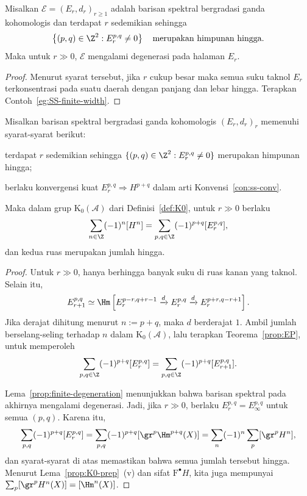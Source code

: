 \begin{lemma}\label{prop:finite-degeneration}
	Misalkan $\mathscr{E}=(E_r,d_r)_{r\geq1}$ adalah barisan spektral
	bergradasi ganda kohomologis dan terdapat $r$ sedemikian sehingga
	\[ \left\{(p,q)\in\Z^2:E_r^{p,q}\neq0\right\}
	\quad\text{merupakan himpunan hingga}. \]
	Maka untuk $r\gg0$, $\mathscr{E}$ mengalami degenerasi pada halaman $E_r$.
\end{lemma}
\begin{proof}
	Menurut syarat tersebut, jika $r$ cukup besar maka semua suku taknol $E_r$
	terkonsentrasi pada suatu daerah dengan panjang dan lebar hingga. Terapkan
	Contoh~\ref{eg:SS-finite-width}.
\end{proof}

\begin{proposition}\label{prop:EP-ss}
	Misalkan barisan spektral bergradasi ganda kohomologis $(E_r,d_r)_r$
	memenuhi syarat-syarat berikut:
	\begin{compactitem}
		\item terdapat $r$ sedemikian sehingga
		$\{(p,q)\in\Z^2:E_r^{p,q}\neq0\}$ merupakan himpunan hingga;
		\item berlaku konvergensi kuat $E_r^{p,q}\Rightarrow H^{p+q}$ dalam
		arti Konvensi~\ref{con:ss-conv}.
	\end{compactitem}
	Maka dalam grup $\mathrm{K}_0(\mathcal{A})$ dari Definisi~\ref{def:K0},
	untuk $r\gg0$ berlaku
	\[ \sum_{n\in\Z}(-1)^n[H^n]
	=\sum_{p,q\in\Z}(-1)^{p+q}[E_r^{p,q}], \]
	dan kedua ruas merupakan jumlah hingga.
\end{proposition}
\begin{proof}
	Untuk $r\gg0$, hanya berhingga banyak suku di ruas kanan yang taknol. Selain
	itu,
	\[ E_{r+1}^{p,q}\simeq\Hm\left[
	E_r^{p-r,q+r-1}\xrightarrow{d}E_r^{p,q}
	\xrightarrow{d}E_r^{p+r,q-r+1}\right]. \]
	Jika derajat dihitung menurut $n:=p+q$, maka $d$ berderajat $1$. Ambil
	jumlah berselang-seling terhadap $n$ dalam $\mathrm{K}_0(\mathcal{A})$,
	lalu terapkan Teorema~\ref{prop:EP}, untuk memperoleh
	\[ \sum_{p,q\in\Z}(-1)^{p+q}[E_r^{p,q}]
	=\sum_{p,q\in\Z}(-1)^{p+q}[E_{r+1}^{p,q}]. \]

	Lema~\ref{prop:finite-degeneration} menunjukkan bahwa barisan spektral pada
	akhirnya mengalami degenerasi. Jadi, jika $r\gg0$, berlaku
	$E_r^{p,q}=E_\infty^{p,q}$ untuk semua $(p,q)$. Karena itu,
	\[ \sum_{p,q}(-1)^{p+q}[E_r^{p,q}]
	=\sum_{p,q}(-1)^{p+q}[\gr^p\Hm^{p+q}(X)]
	=\sum_n(-1)^n\sum_p[\gr^pH^n], \]
	dan syarat-syarat di atas memastikan bahwa semua jumlah tersebut hingga.
	Menurut Lema~\ref{prop:K0-prep}~(v) dan sifat $\mathrm{F}^\bullet H$, kita
	juga mempunyai
	$\sum_p[\gr^pH^n(X)]=[\Hm^n(X)]$.
\end{proof}

